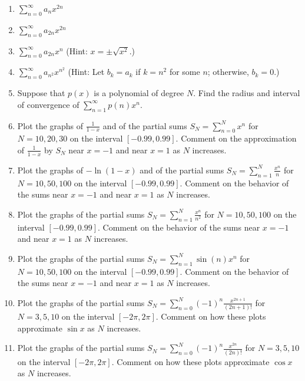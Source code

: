 \documentclass{exercises}
\begin{document}
\begin{enumerate}[resume]
\item $\sum_{n=0}^{\infty}a_{n}x^{2n}$
\item $\sum_{n=0}^{\infty}a_{2n}x^{2n}$
\item $\sum_{n=0}^{\infty}a_{2n}x^{n}$ (Hint: $x=\pm\sqrt{x^{2}}$.)
\item $\sum_{n=0}^{\infty}a_{n^{2}}x^{n^{2}}$ (Hint: Let $b_{k}=a_{k}$ if $k=n^{2}$ for some $n$; otherwise, $b_{k}=0$.)
\item Suppose that $p(x)$ is a polynomial of degree $N$. Find the radius and interval of convergence of $\sum_{n=1}^{\infty}p(n)x^{n}$.
\item \techrequired Plot the graphs of $\frac{1}{1-x}$ and of the partial sums $S_{N}=\sum_{n=0}^{N}x^{n}$ for $N=10,20,30$ on the interval $[-0.99,0.99]$. Comment on the approximation of $\frac{1}{1-x}$ by $S_{N}$ near $x=-1$ and near $x=1$ as $N$ increases.
\item \techrequired Plot the graphs of $-\ln (1-x)$ and of the partial sums $S_{N}=\sum_{n=1}^{N}\frac{x^{n}}{n}$ for $N=10,50,100$ on the interval $[-0.99,0.99]$. Comment on the behavior of the sums near $x=-1$ and near $x=1$ as $N$ increases.
\item \techrequired Plot the graphs of the partial sums $S_{N}=\sum_{n=1}^{N}\frac{x^{n}}{n^{2}}$ for $N=10,50,100$ on the interval $[-0.99,0.99]$. Comment on the behavior of the sums near $x=-1$ and near $x=1$ as $N$ increases.
\item \techrequired Plot the graphs of the partial sums $S_{N}=\sum_{n=1}^{N}\sin(n)x^{n}$ for $N=10,50,100$ on the interval $[-0.99,0.99]$. Comment on the behavior of the sums near $x=-1$ and near $x=1$ as $N$ increases.
\item \techrequired Plot the graphs of the partial sums $S_{N}=\sum_{n=0}^{N}{(-1)}^{n}\frac{x^{2n+1}}{(2n+1)!}$ for $N=3,5,10$ on the interval $[-2\pi,2\pi]$. Comment on how these plots approximate $\sin x$ as $N$ increases.
\item \techrequired Plot the graphs of the partial sums $S_{N}=\sum_{n=0}^{N}{(-1)}^{n}\frac{x^{2n}}{(2n)!}$ for $N=3,5,10$ on the interval $[-2\pi,2\pi]$. Comment on how these plots approximate $\cos x$ as $N$ increases.
\end{enumerate}
\end{document}
